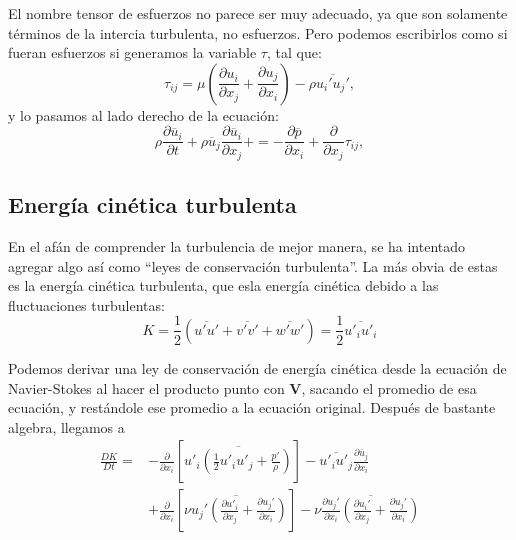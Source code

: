 El nombre tensor de esfuerzos no parece ser muy adecuado, ya que son solamente términos de la intercia turbulenta, no esfuerzos.
Pero podemos escribirlos como si fueran esfuerzos si generamos la variable $\tau$, tal que:
%
\begin{equation}
\tau_{ij} = \mu\left(\frac{\partial u_i}{\partial x_j} + \frac{\partial u_j}{\partial x_i}\right) - \rho \overline{u_i'u_j'},
\end{equation}
%
y lo pasamos al lado derecho de la ecuación:
%
\begin{equation}\label{eq:tensor}
\rho\frac{\partial \overline{u}_i}{\partial t} + \rho\overline{u}_j\frac{\partial \overline{u}_i}{\partial x_j} +  = -\frac{\partial \overline{p}}{\partial x_i} + \frac{\partial}{\partial x_j}\tau_{ij},
\end{equation}

\subsection*{Energía cinética turbulenta}
En el afán de comprender la turbulencia de mejor manera, se ha intentado agregar algo así como ``leyes de conservación turbulenta''.
La más obvia de estas es la energía cinética turbulenta, que esla energía cinética debido a las fluctuaciones turbulentas:
%
\begin{equation}
K = \frac{1}{2}\left( \overline{u'u'}+\overline{v'v'}+\overline{w'w'}\right)=\frac{1}{2}\overline{u'_iu'_i}
\end{equation}

Podemos derivar una ley de conservación de energía cinética desde la ecuación de Navier-Stokes al hacer el producto punto con $\mathbf{V}$, sacando el promedio de esa ecuación, y restándole ese promedio a la ecuación original. 
Después de bastante algebra, llegamos a
%
\begin{align}\label{eq:K_conservacion}
\frac{DK}{Dt} =& -\frac{\partial}{\partial x_i} \left[ \overline{u'_i\left(\frac{1}{2}u'_iu'_j+\frac{p'}{\rho}\right)}\right] - \overline{u'_iu'_j}\frac{\partial\overline{u}_j}{\partial x_i} \nonumber\\
               & + \frac{\partial}{\partial x_i}\left[\overline{\nu u_j'\left(\frac{\partial u'_i}{\partial x_j} + \frac{\partial u_j'}{\partial x_i}\right)}\right] -\nu\overline{\frac{\partial u_j'}{\partial x_i}\left(\frac{\partial u_i'}{\partial x_j}+\frac{\partial u_j'}{\partial x_i}\right)}
\end{align}

